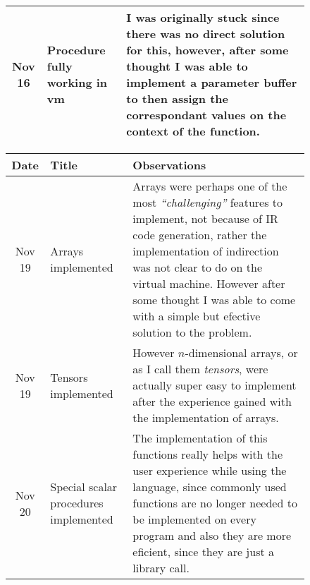 \begin{figure}[h]
\begin{tabular}{cp{1.25in}p{2.5in}}
        \midrule
        Nov 16 & Procedure fully working in vm &
        I was originally stuck since there was no direct solution for this,
        however, after some thought I was able to implement a parameter buffer
        to then assign the correspondant values on the context of the function.\\

        \bottomrule
    \end{tabular}
\end{figure}

\begin{figure}[h]
    \centering
    \begin{tabular}{cp{1.25in}p{2.5in}}
        \toprule
        \textbf{Date} & \textbf{Title} & \textbf{Observations}\\
        \midrule
        Nov 19 & Arrays implemented &
        Arrays were perhaps one of the most \emph{``challenging''} features to
        implement, not because of IR code generation, rather the implementation
        of indirection was not clear to do on the virtual machine. However
        after some thought I was able to come with a simple but efective
        solution to the problem.\\ 

        \midrule
        Nov 19 & Tensors \newline implemented &
        However $n$-dimensional arrays, or as I call them \emph{tensors}, were
        actually super easy to implement after the experience gained with the
        implementation of arrays.\\

        \midrule
        Nov 20 & Special scalar \newline procedures \newline implemented &
        The implementation of this functions really helps with the user
        experience while using the language, since commonly used functions are
        no longer needed to be implemented on every program and also they are
        more eficient, since they are just a \newline library call.\\

        \bottomrule
    \end{tabular}
\end{figure}
